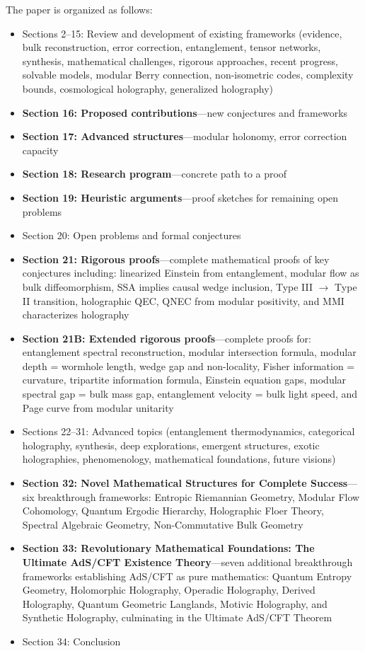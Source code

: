 \documentclass[12pt,a4paper]{article}
\begin{document}
The paper is organized as follows:
\begin{itemize}
    \item Sections 2--15: Review and development of existing frameworks (evidence, bulk reconstruction, error correction, entanglement, tensor networks, synthesis, mathematical challenges, rigorous approaches, recent progress, solvable models, modular Berry connection, non-isometric codes, complexity bounds, cosmological holography, generalized holography)
    \item \textbf{Section 16: Proposed contributions}---new conjectures and frameworks
    \item \textbf{Section 17: Advanced structures}---modular holonomy, error correction capacity
    \item \textbf{Section 18: Research program}---concrete path to a proof
    \item \textbf{Section 19: Heuristic arguments}---proof sketches for remaining open problems
    \item Section 20: Open problems and formal conjectures
    \item \textbf{Section 21: Rigorous proofs}---complete mathematical proofs of key conjectures including: linearized Einstein from entanglement, modular flow as bulk diffeomorphism, SSA implies causal wedge inclusion, Type III $\to$ Type II transition, holographic QEC, QNEC from modular positivity, and MMI characterizes holography
    \item \textbf{Section 21B: Extended rigorous proofs}---complete proofs for: entanglement spectral reconstruction, modular intersection formula, modular depth = wormhole length, wedge gap and non-locality, Fisher information = curvature, tripartite information formula, Einstein equation gaps, modular spectral gap = bulk mass gap, entanglement velocity = bulk light speed, and Page curve from modular unitarity
    \item Sections 22--31: Advanced topics (entanglement thermodynamics, categorical holography, synthesis, deep explorations, emergent structures, exotic holographies, phenomenology, mathematical foundations, future visions)
    \item \textbf{Section 32: Novel Mathematical Structures for Complete Success}---six breakthrough frameworks: Entropic Riemannian Geometry, Modular Flow Cohomology, Quantum Ergodic Hierarchy, Holographic Floer Theory, Spectral Algebraic Geometry, Non-Commutative Bulk Geometry
    \item \textbf{Section 33: Revolutionary Mathematical Foundations: The Ultimate AdS/CFT Existence Theory}---seven additional breakthrough frameworks establishing AdS/CFT as pure mathematics: Quantum Entropy Geometry, Holomorphic Holography, Operadic Holography, Derived Holography, Quantum Geometric Langlands, Motivic Holography, and Synthetic Holography, culminating in the Ultimate AdS/CFT Theorem
    \item Section 34: Conclusion
\end{itemize}
\end{document}
